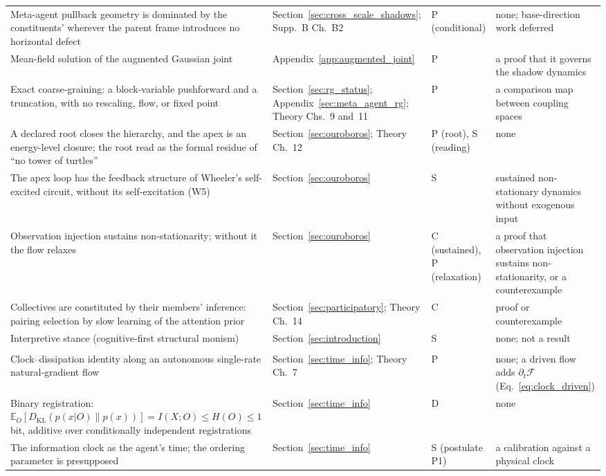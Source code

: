\documentclass[11pt]{article}
\begin{document}
{\begin{longtable}{@{}>{\raggedright\arraybackslash}p{}>{\raggedright\arraybackslash}p{}>{\raggedright\arraybackslash}p{}>{\raggedright\arraybackslash}p{}@{}}
Meta-agent pullback geometry is dominated by the constituents' wherever the parent frame introduces no horizontal defect & Section~\ref{sec:cross_scale_shadows}; Supp.~B Ch.~B2 & P (conditional) & none; base-direction work deferred \\
Mean-field solution of the augmented Gaussian joint & Appendix~\ref{app:augmented_joint} & P & a proof that it governs the shadow dynamics \\
Exact coarse-graining: a block-variable pushforward and a truncation, with no rescaling, flow, or fixed point & Section~\ref{sec:rg_status}; Appendix~\ref{sec:meta_agent_rg}; Theory Chs.~9 and~11 & P & a comparison map between coupling spaces \\
A declared root closes the hierarchy, and the apex is an energy-level closure; the root read as the formal residue of ``no tower of turtles'' & Section~\ref{sec:ouroboros}; Theory Ch.~12 & P (root), S (reading) & none \\
The apex loop has the feedback structure of Wheeler's self-excited circuit, without its self-excitation (W5) & Section~\ref{sec:ouroboros} & S & sustained non-stationary dynamics without exogenous input \\
Observation injection sustains non-stationarity; without it the flow relaxes & Section~\ref{sec:ouroboros} & C (sustained), P (relaxation) & a proof that observation injection sustains non-stationarity, or a counterexample \\
Collectives are constituted by their members' inference: pairing selection by slow learning of the attention prior & Section~\ref{sec:participatory}; Theory Ch.~14 & C & proof or counterexample \\
Interpretive stance (cognitive-first structural monism) & Section~\ref{sec:introduction} & S & none; not a result \\
\multicolumn{4}{@{}l}{\emph{Part II: the speculative program}}\\
Clock--dissipation identity along an autonomous single-rate natural-gradient flow & Section~\ref{sec:time_info}; Theory Ch.~7 & P & none; a driven flow adds $\partial_t\mathcal{F}$ (Eq.~\eqref{eq:clock_driven}) \\
Binary registration: $\mathbb{E}_O[D_{\mathrm{KL}}(p(x|O)\|p(x))] = I(X;O)\le H(O)\le 1$ bit, additive over conditionally independent registrations & Section~\ref{sec:time_info} & D & none \\
The information clock as the agent's time; the ordering parameter is presupposed & Section~\ref{sec:time_info} & S (postulate P1) & a calibration against a physical clock \\

\end{longtable}}
\end{document}
